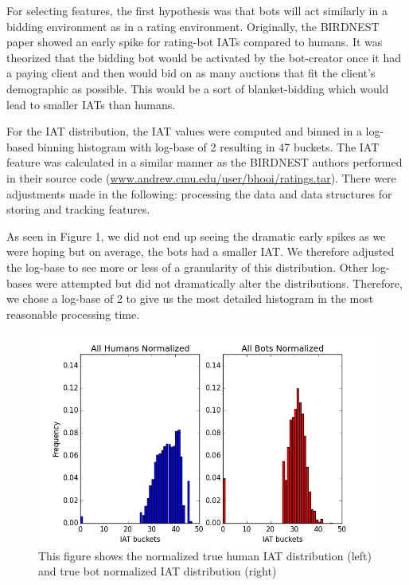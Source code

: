 \documentclass{article} %
\begin{document}
For selecting features, the first hypothesis was that bots will act similarly in a bidding environment as in a rating environment. Originally, the BIRDNEST paper showed an early spike for rating-bot IATs compared to humans. It was theorized that the bidding bot would be activated by the bot-creator once it had a paying client and then would bid on as many auctions that fit the client's demographic as possible. This would be a sort of blanket-bidding which would lead to smaller IATs than humans.

For the IAT distribution, the IAT values were computed and binned in a log-based binning histogram with log-base of 2 resulting in 47 buckets. The IAT feature was calculated in a similar manner as the BIRDNEST authors performed in their source code (\url{www.andrew.cmu.edu/user/bhooi/ratings.tar}). There were adjustments made in the following: processing the data and data structures for storing and tracking features.

As seen in Figure 1, we did not end up seeing the dramatic early spikes as we were hoping but on average, the bots had a smaller IAT. We therefore adjusted the log-base to see more or less of a granularity of this distribution. Other log-bases were attempted but did not dramatically alter the distributions. Therefore, we chose a log-base of 2 to give us the most detailed histogram in the most reasonable processing time.

\begin{figure}[!htb]
\centering
{\caption{This figure shows the normalized true human IAT distribution (left) and true bot normalized IAT distribution (right)} \includegraphics[scale=0.5]{img/bird_iat_dist.png}}
\end{figure}
\end{document}
